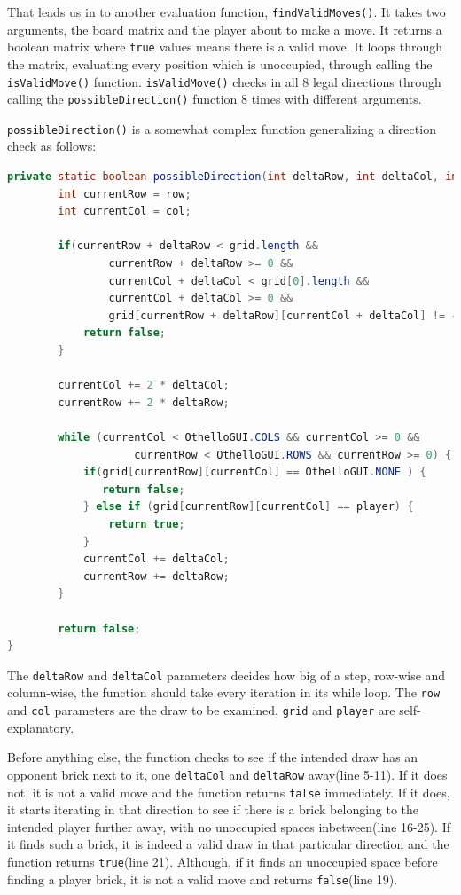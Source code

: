 \documentclass{article}
\begin{document}
That leads us in to another evaluation function, \verb|findValidMoves()|. It takes
two arguments, the board matrix and the player about to make a move. It returns a
boolean matrix where \verb|true| values means there is a valid move. It loops through the matrix,
evaluating every position which is unoccupied, through calling the \verb|isValidMove()|
function. \verb|isValidMove()| checks in all 8 legal directions through calling the
\verb|possibleDirection()| function 8 times with different arguments.

\verb|possibleDirection()| is a somewhat complex function generalizing a direction check as follows:

\begin{lstlisting}[language=Java]
private static boolean possibleDirection(int deltaRow, int deltaCol, int row, int col, int[][] grid, int player) {
        int currentRow = row;
        int currentCol = col;

        if(currentRow + deltaRow < grid.length &&
                currentRow + deltaRow >= 0 &&
                currentCol + deltaCol < grid[0].length &&
                currentCol + deltaCol >= 0 &&
                grid[currentRow + deltaRow][currentCol + deltaCol] != -player) {
            return false;
        }

        currentCol += 2 * deltaCol;
        currentRow += 2 * deltaRow;

        while (currentCol < OthelloGUI.COLS && currentCol >= 0 &&
                    currentRow < OthelloGUI.ROWS && currentRow >= 0) {
            if(grid[currentRow][currentCol] == OthelloGUI.NONE ) {
               return false;
            } else if (grid[currentRow][currentCol] == player) {
                return true;
            }
            currentCol += deltaCol;
            currentRow += deltaRow;
        }

        return false;
}
\end{lstlisting}

The \verb|deltaRow| and \verb|deltaCol| parameters decides how big of a step, row-wise and column-wise,
the function should take every iteration in its while loop. The \verb|row| and \verb|col| parameters are
the draw to be examined, \verb|grid| and \verb|player| are self-explanatory.

Before anything else, the function checks to see if the intended draw has an opponent brick next to it,
one \verb|deltaCol| and \verb|deltaRow| away(line 5-11). If it does not, it is not a valid move and the function returns \verb|false|
immediately. If it does, it starts iterating in that direction to see if there is a brick belonging
to the intended player further away, with no unoccupied spaces inbetween(line 16-25). If it finds such a brick,
it is indeed a valid draw in that particular direction and the function returns \verb|true|(line 21). Although, if it finds
an unoccupied space before finding a player brick, it is not a valid move and returns \verb|false|(line 19).
\end{document}
